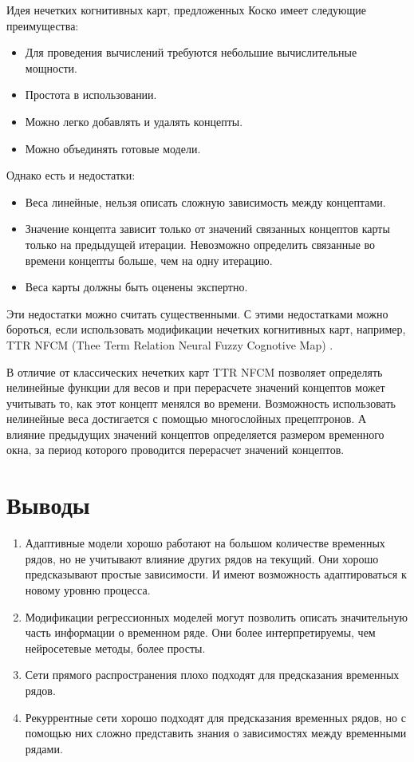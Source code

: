 Идея нечетких когнитивных карт, предложенных Коско \cite{kosko1986fuzzy} имеет следующие преимущества:

\begin{itemize}
	\item Для проведения вычислений требуются небольшие вычислительные мощности.
	\item Простота в использовании.
	\item Можно легко добавлять и удалять концепты.
	\item Можно объединять готовые модели.
\end{itemize}

Однако есть и недостатки:

\begin{itemize}
	\item Веса линейные, нельзя описать сложную зависимость между концептами.
	\item Значение концепта зависит только от значений связанных концептов карты только на предыдущей итерации.
	Невозможно определить связанные во времени концепты больше, чем на одну итерацию.
	\item Веса карты должны быть оценены экспертно.
\end{itemize}

Эти недостатки можно считать существенными.
С этими недостатками можно бороться, если использовать модификации нечетких когнитивных карт,
например, TTR NFCM (Thee Term Relation Neural Fuzzy Cognotive Map) \cite{threeTermNfcm}.

В отличие от классических нечетких карт TTR NFCM позволяет
определять нелинейные функции для весов и при перерасчете значений концептов может учитывать то, как
этот концепт менялся во времени. Возможность использовать нелинейные веса достигается с помощью многослойных прецептронов.
А влияние предыдущих значений концептов определяется размером временного окна, за период которого проводится перерасчет
значений концептов.


\section{Выводы}

\begin{enumerate}
	\item Адаптивные модели хорошо работают на большом количестве временных рядов,
	но не учитывают влияние других рядов на текущий. Они хорошо предсказывают простые зависимости.
	И имеют возможность адаптироваться к новому уровню процесса.
	\item Модификации регрессионных моделей могут позволить описать значительную
	часть информации о временном ряде. Они более интерпретируемы, чем нейросетевые методы, более просты.
	\item Сети прямого распространения плохо подходят для предсказания временных рядов.
	\item Рекуррентные сети хорошо подходят для предсказания временных рядов, но
	с помощью них сложно представить знания о зависимостях между временными рядами.
\end{enumerate}


